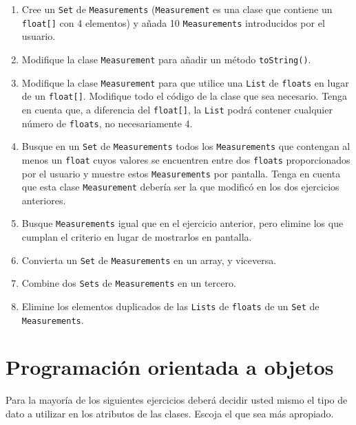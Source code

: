 \documentclass[a4paper]{article}
\newcommand{\code}[1]{\texttt{#1}}
\begin{document}
\begin{enumerate}
    \item Cree un \code{Set} de \code{Measurements} (\code{Measurement} es una clase que contiene un \code{float[]} con 4 elementos) y añada 10 \code{Measurements} introducidos por el usuario.
    \item Modifique la clase \code{Measurement} para añadir un método \code{toString()}.
    \item Modifique la clase \code{Measurement} para que utilice una \code{List} de \code{floats} en lugar de un \code{float[]}. Modifique todo el código de la clase que sea necesario. Tenga en cuenta que, a diferencia del \code{float[]}, la \code{List} podrá contener cualquier número de \code{floats}, no necesariamente 4.
    \item Busque en un \code{Set} de \code{Measurements} todos los \code{Measurements} que contengan al menos un \code{float} cuyos valores se encuentren entre dos \code{floats} proporcionados por el usuario y muestre estos \code{Measurements} por pantalla. Tenga en cuenta que esta clase \code{Measurement} debería ser la que modificó en los dos ejercicios anteriores.
    \item Busque \code{Measurements} igual que en el ejercicio anterior, pero elimine los que cumplan el criterio en lugar de mostrarlos en pantalla.
    \item Convierta un \code{Set} de \code{Measurements} en un array, y viceversa.
    \item Combine dos \code{Sets} de \code{Measurements} en un tercero.
    \item Elimine los elementos duplicados de las \code{Lists} de \code{floats} de un \code{Set} de \code{Measurements}.
\end{enumerate}

\section{Programación orientada a objetos}
\label{sec:poo}

Para la mayoría de los siguientes ejercicios deberá decidir usted mismo el tipo de dato a utilizar en los atributos de las clases. Escoja el que sea más apropiado.
\end{document}
